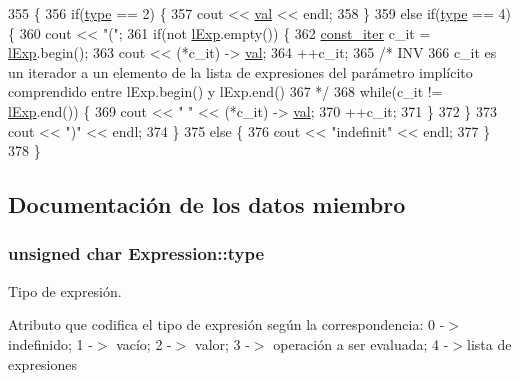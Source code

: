\begin{DoxyCode}
355 \{
356   \textcolor{keywordflow}{if}(\hyperlink{class_expression_a2c094b93c4863b1f851ea2136aae9612}{type} == 2) \{
357     cout << \hyperlink{class_expression_a9c15b529b5d59e6bffb3855e384c04aa}{val} << endl;
358   \}
359   \textcolor{keywordflow}{else} \textcolor{keywordflow}{if}(\hyperlink{class_expression_a2c094b93c4863b1f851ea2136aae9612}{type} == 4) \{
360     cout << \textcolor{stringliteral}{"("};
361     \textcolor{keywordflow}{if}(not \hyperlink{class_expression_afb4f4617291f7e182cbf2252151b122a}{lExp}.empty()) \{
362       \hyperlink{_expression_8cc_a6ff59711533978050143f1bfb54c33b1}{const\_iter} c\_it = \hyperlink{class_expression_afb4f4617291f7e182cbf2252151b122a}{lExp}.begin();
363       cout << (*c\_it) -> \hyperlink{class_expression_a9c15b529b5d59e6bffb3855e384c04aa}{val};
364       ++c\_it;
365       \textcolor{comment}{/* INV}
366 \textcolor{comment}{        c\_it es un iterador a un elemento de la lista de expresiones del parámetro implícito comprendido
       entre lExp.begin() y lExp.end()}
367 \textcolor{comment}{      */}
368       \textcolor{keywordflow}{while}(c\_it != \hyperlink{class_expression_afb4f4617291f7e182cbf2252151b122a}{lExp}.end()) \{
369         cout << \textcolor{stringliteral}{" "} << (*c\_it) -> \hyperlink{class_expression_a9c15b529b5d59e6bffb3855e384c04aa}{val};
370         ++c\_it;
371       \}
372     \}
373     cout << \textcolor{stringliteral}{")"} << endl;
374   \}
375   \textcolor{keywordflow}{else} \{
376     cout << \textcolor{stringliteral}{"indefinit"} << endl;
377   \}
378 \}
\end{DoxyCode}


\subsection{Documentación de los datos miembro}
\subsubsection[{\texorpdfstring{type}{type}}]{\setlength{\rightskip}{0pt plus 5cm}unsigned char Expression\+::type\hspace{0.3cm}{\ttfamily [private]}}\hypertarget{class_expression_a2c094b93c4863b1f851ea2136aae9612}{}\label{class_expression_a2c094b93c4863b1f851ea2136aae9612}


Tipo de expresión. 

Atributo que codifica el tipo de expresión según la correspondencia\+: 0 -\/$>$ indefinido; 1 -\/$>$ vacío; 2 -\/$>$ valor; 3 -\/$>$ operación a ser evaluada; 4 -\/$>$lista de expresiones 

